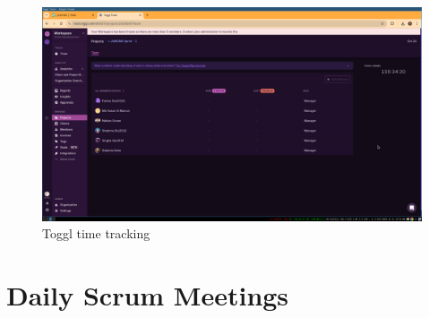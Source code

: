 \documentclass[a4paper,12pt]{article}
\begin{document}
\begin{figure}[H]
    \centering
    \includegraphics[width=\textwidth]{toggl.png}
    \caption{Toggl time tracking}
\end{figure}

\newpage
\section{Daily Scrum Meetings}
\end{document}
